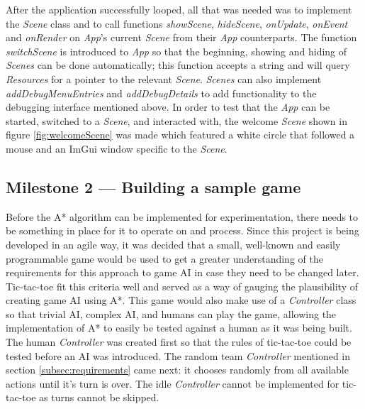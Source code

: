 \documentclass[11pt, a4paper]{report}
\begin{document}
After the application successfully looped, all that was needed was to implement the \emph{Scene} class and to call functions \emph{showScene}, \emph{hideScene}, \emph{onUpdate}, \emph{onEvent} and \emph{onRender} on \emph{App}'s current \emph{Scene} from their \emph{App} counterparts. The function \emph{switchScene} is introduced to \emph{App} so that the beginning, showing and hiding of \emph{Scenes} can be done automatically; this function accepts a string and will query \emph{Resources} for a pointer to the relevant \emph{Scene}. \emph{Scenes} can also implement \emph{addDebugMenuEntries} and \emph{addDebugDetails} to add functionality to the debugging interface mentioned above. In order to test that the \emph{App} can be started, switched to a \emph{Scene}, and interacted with, the welcome \emph{Scene} shown in figure \ref{fig:welcomeScene} was made which featured a white circle that followed a mouse and an ImGui window specific to the \emph{Scene}.

\subsection[Building a sample game]{Milestone 2 --- Building a sample game}
\label{subsec:buildingASampleGame}

Before the A* algorithm can be implemented for experimentation, there needs to be something in place for it to operate on and process. Since this project is being developed in an agile way, it was decided that a small, well-known and easily programmable game would be used to get a greater understanding of the requirements for this approach to game AI in case they need to be changed later. Tic-tac-toe fit this criteria well and served as a way of gauging the plausibility of creating game AI using A*. This game would also make use of a \emph{Controller} class so that trivial AI, complex AI, and humans can play the game, allowing the implementation of A* to easily be tested against a human as it was being built. The human \emph{Controller} was created first so that the rules of tic-tac-toe could be tested before an AI was introduced. The random team \emph{Controller} mentioned in section \ref{subsec:requirements} came next: it chooses randomly from all available actions until it's turn is over. The idle \emph{Controller} cannot be implemented for tic-tac-toe as turns cannot be skipped.
\end{document}
